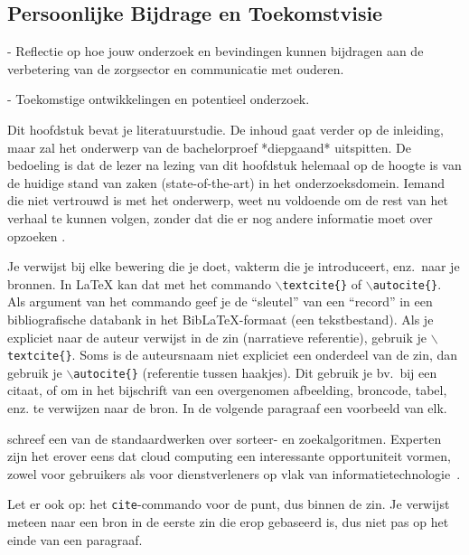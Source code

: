 \subsection{Persoonlijke Bijdrage en Toekomstvisie}

- Reflectie op hoe jouw onderzoek en bevindingen kunnen bijdragen aan de verbetering van de zorgsector en communicatie met ouderen. 

- Toekomstige ontwikkelingen en potentieel onderzoek. 


Dit hoofdstuk bevat je literatuurstudie. De inhoud gaat verder op de inleiding, maar zal het onderwerp van de bachelorproef *diepgaand* uitspitten. De bedoeling is dat de lezer na lezing van dit hoofdstuk helemaal op de hoogte is van de huidige stand van zaken (state-of-the-art) in het onderzoeksdomein. Iemand die niet vertrouwd is met het onderwerp, weet nu voldoende om de rest van het verhaal te kunnen volgen, zonder dat die er nog andere informatie moet over opzoeken \autocite{Pollefliet2011}.

Je verwijst bij elke bewering die je doet, vakterm die je introduceert, enz.\ naar je bronnen. In \LaTeX{} kan dat met het commando \texttt{$\backslash${textcite\{\}}} of \texttt{$\backslash${autocite\{\}}}. Als argument van het commando geef je de ``sleutel'' van een ``record'' in een bibliografische databank in het Bib\LaTeX{}-formaat (een tekstbestand). Als je expliciet naar de auteur verwijst in de zin (narratieve referentie), gebruik je \texttt{$\backslash${}textcite\{\}}. Soms is de auteursnaam niet expliciet een onderdeel van de zin, dan gebruik je \texttt{$\backslash${}autocite\{\}} (referentie tussen haakjes). Dit gebruik je bv.~bij een citaat, of om in het bijschrift van een overgenomen afbeelding, broncode, tabel, enz. te verwijzen naar de bron. In de volgende paragraaf een voorbeeld van elk.

\textcite{Knuth1998} schreef een van de standaardwerken over sorteer- en zoekalgoritmen. Experten zijn het erover eens dat cloud computing een interessante opportuniteit vormen, zowel voor gebruikers als voor dienstverleners op vlak van informatietechnologie~\autocite{Creeger2009}.

Let er ook op: het \texttt{cite}-commando voor de punt, dus binnen de zin. Je verwijst meteen naar een bron in de eerste zin die erop gebaseerd is, dus niet pas op het einde van een paragraaf.

\lipsum[7-20]
